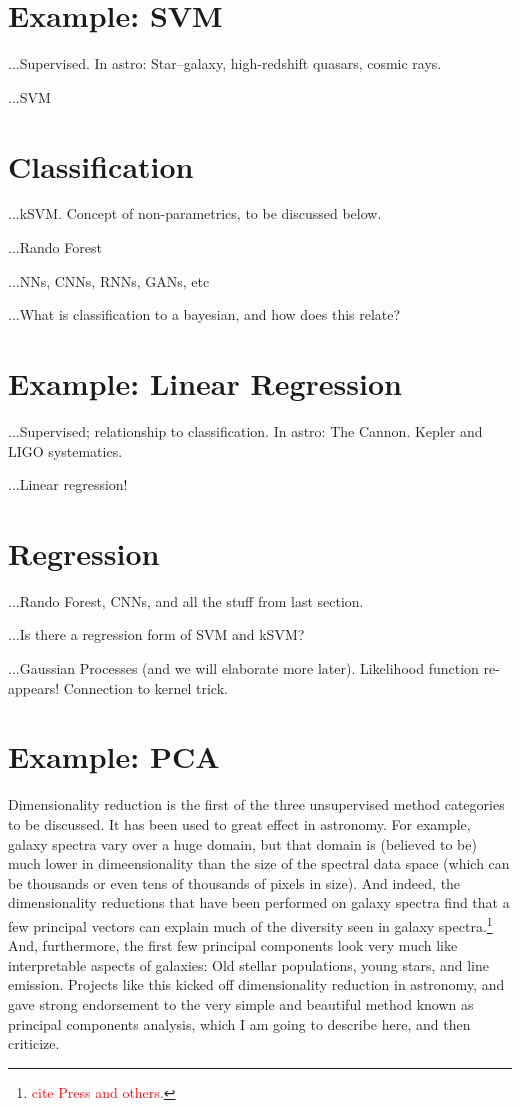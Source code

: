 \documentclass[12pt, letterpaper]{article}
\newcommand{\todo}[1]{\textcolor{red}{#1}}  %
\begin{document}
\section{Example: SVM}

...Supervised. In astro: Star--galaxy, high-redshift quasars, cosmic rays.

...SVM

\section{Classification}

...kSVM. Concept of non-parametrics, to be discussed below.

...Rando Forest

...NNs, CNNs, RNNs, GANs, etc

...What is classification to a bayesian, and how does this relate?

\section{Example: Linear Regression}

...Supervised; relationship to classification. In astro: The Cannon. Kepler and LIGO systematics.

...Linear regression!

\section{Regression}

...Rando Forest, CNNs, and all the stuff from last section.

...Is there a regression form of SVM and kSVM?

...Gaussian Processes (and we will elaborate more later).
Likelihood function re-appears!
Connection to kernel trick.

\section{Example: PCA}

Dimensionality reduction is the first of the three unsupervised
method categories to be discussed.
It has been used to great effect in astronomy.
For example, galaxy spectra vary over a huge domain, but that
domain is (believed to be) much lower in dimeensionality than the size
of the spectral data space (which can be thousands or even tens of
thousands of pixels in size).
And indeed, the dimensionality reductions that have been performed on
galaxy spectra find that a few principal vectors can explain much of
the diversity seen in galaxy spectra.\footnote{\todo{cite Press and
    others.}}
And, furthermore, the first few principal components look very much
like interpretable aspects of galaxies: Old stellar populations, young
stars, and line emission.
Projects like this kicked off dimensionality reduction in astronomy,
and gave strong endorsement to the very simple and beautiful method
known as principal components analysis, which I am going to describe
here, and then criticize.
\end{document}
